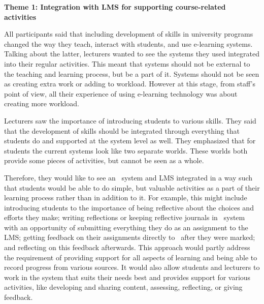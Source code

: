 \textbf{Theme 1: Integration with LMS for supporting course-related activities}

All participants said that including development of \LLLs skills in university
programs changed the way they teach, interact with students, and use e-learning
systems. Talking about the latter, lecturers wanted to see the systems they used
integrated into their regular activities. This meant that systems should not be
external to the teaching and learning process, but be a part of it. Systems
should not be seen as creating extra work or adding to workload. However at
this stage, from staff's point of view, all their experience of using e-learning
technology was about creating more workload.


Lecturers saw the importance of introducing students to various \LLLs skills.
They said that the development of \LLLs skills should be integrated through
everything that students do and supported at the system level as well. They
emphasized that for students the current systems look like two separate worlds.
These worlds both provide some pieces of activities, but cannot be seen as a
whole.


Therefore, they would like to see an \ep~system and LMS integrated in a way
such that students would be able to do simple, but valuable activities as a part
of their learning process rather than in addition to it. For example, this might
include introducing students to the importance of being reflective about the
choices and efforts they make; writing reflections or keeping reflective
journals in \ep~system with an opportunity of submitting everything they do as
an assignment to the LMS; getting feedback on their assignments directly to
\ep~after they were marked; and reflecting on this feedback afterwards. This
approach would partly address the requirement of providing support for all
aspects of learning and being able to record progress from various sources. It
would also allow students and lecturers to work in the system that suits their
needs best and provides support for various activities, like developing and
sharing content, assessing, reflecting, or giving feedback.

